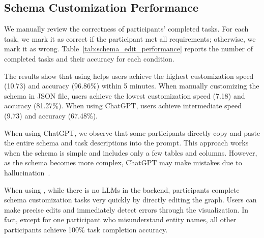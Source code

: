 \subsection{Schema Customization Performance}
We manually review the correctness of participants' completed tasks. For each task, we mark it as correct if the participant met all requirements; otherwise, we mark it as wrong. Table~\ref{tab:schema_edit_performance} reports the number of completed tasks and their accuracy for each condition.

The results show that using {\tool} helps users achieve the highest customization speed (10.73) and accuracy (96.86\%) within 5 minutes. When manually customizing the schema in JSON file, users achieve the lowest customization speed (7.18) and accuracy (81.27\%). When using ChatGPT, users achieve intermediate speed (9.73) and accuracy (67.48\%).

When using ChatGPT, we observe that some participants directly copy and paste the entire schema and task descriptions into the prompt. This approach works when the schema is simple and includes only a few tables and columns. However, as the schema becomes more complex, ChatGPT may make mistakes due to hallucination~\cite{llm_hallucination}.

When using {\tool}, while there is no LLMs in the backend, participants complete schema customization tasks very quickly by directly editing the graph. Users can make precise edits and immediately detect errors through the visualization. In fact, except for one participant who misunderstand entity names, all other participants achieve 100\% task completion accuracy.

\begin{table}[htb]
    \centering
    \caption{Schema Customization Speed and Accuracy.}
    \vspace{-2.5mm}
    
    \label{tab:schema_edit_performance}
\end{table}



